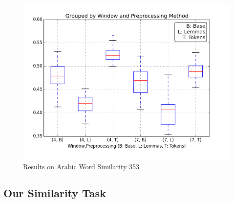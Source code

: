 \begin{figure}
  \includegraphics[width=\linewidth]{results_spearman/ar_similiarity_task_results_ws353_spearplot.png}
  \caption{Results on Arabic Word Similarity 353}
  \label{fig:spearplotws353}
\end{figure}

\subsection{Our Similarity Task}

